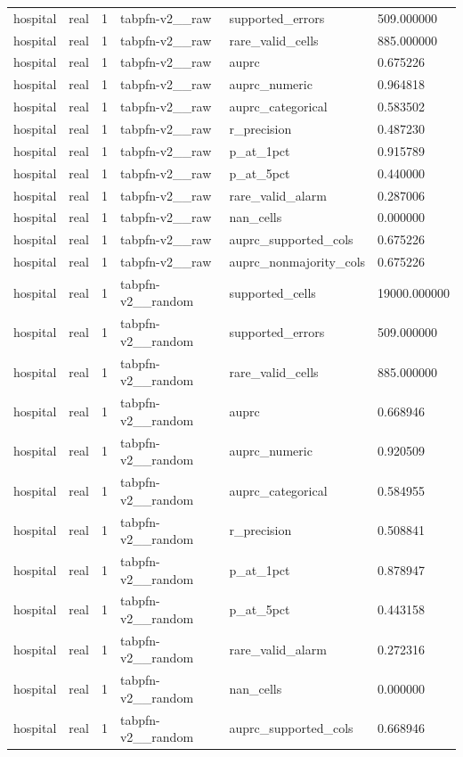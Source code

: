 \begin{tabular}{llllll}
hospital & real & 1 & tabpfn-v2\_\_raw & supported\_errors & 509.000000 \\
hospital & real & 1 & tabpfn-v2\_\_raw & rare\_valid\_cells & 885.000000 \\
hospital & real & 1 & tabpfn-v2\_\_raw & auprc & 0.675226 \\
hospital & real & 1 & tabpfn-v2\_\_raw & auprc\_numeric & 0.964818 \\
hospital & real & 1 & tabpfn-v2\_\_raw & auprc\_categorical & 0.583502 \\
hospital & real & 1 & tabpfn-v2\_\_raw & r\_precision & 0.487230 \\
hospital & real & 1 & tabpfn-v2\_\_raw & p\_at\_1pct & 0.915789 \\
hospital & real & 1 & tabpfn-v2\_\_raw & p\_at\_5pct & 0.440000 \\
hospital & real & 1 & tabpfn-v2\_\_raw & rare\_valid\_alarm & 0.287006 \\
hospital & real & 1 & tabpfn-v2\_\_raw & nan\_cells & 0.000000 \\
hospital & real & 1 & tabpfn-v2\_\_raw & auprc\_supported\_cols & 0.675226 \\
hospital & real & 1 & tabpfn-v2\_\_raw & auprc\_nonmajority\_cols & 0.675226 \\
hospital & real & 1 & tabpfn-v2\_\_random & supported\_cells & 19000.000000 \\
hospital & real & 1 & tabpfn-v2\_\_random & supported\_errors & 509.000000 \\
hospital & real & 1 & tabpfn-v2\_\_random & rare\_valid\_cells & 885.000000 \\
hospital & real & 1 & tabpfn-v2\_\_random & auprc & 0.668946 \\
hospital & real & 1 & tabpfn-v2\_\_random & auprc\_numeric & 0.920509 \\
hospital & real & 1 & tabpfn-v2\_\_random & auprc\_categorical & 0.584955 \\
hospital & real & 1 & tabpfn-v2\_\_random & r\_precision & 0.508841 \\
hospital & real & 1 & tabpfn-v2\_\_random & p\_at\_1pct & 0.878947 \\
hospital & real & 1 & tabpfn-v2\_\_random & p\_at\_5pct & 0.443158 \\
hospital & real & 1 & tabpfn-v2\_\_random & rare\_valid\_alarm & 0.272316 \\
hospital & real & 1 & tabpfn-v2\_\_random & nan\_cells & 0.000000 \\
hospital & real & 1 & tabpfn-v2\_\_random & auprc\_supported\_cols & 0.668946 \\

\end{tabular}
